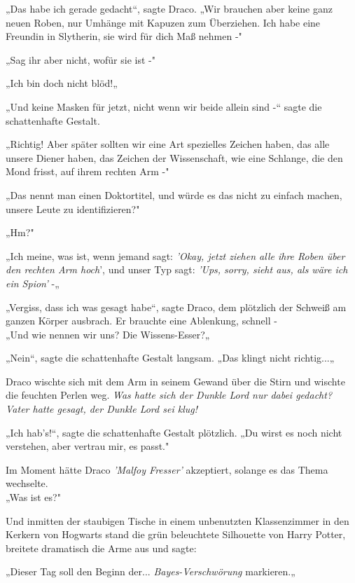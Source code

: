 {„Das habe ich gerade gedacht“, sagte Draco. „Wir brauchen aber keine ganz neuen Roben, nur Umhänge mit Kapuzen zum Überziehen. Ich habe eine Freundin in Slytherin, sie wird für dich Maß nehmen -"

„Sag ihr aber nicht, wofür sie ist -"

„Ich bin doch nicht blöd!„

„Und keine Masken für jetzt, nicht wenn wir beide allein sind -“ sagte die schattenhafte Gestalt.

„Richtig! Aber später sollten wir eine Art spezielles Zeichen haben, das alle unsere Diener haben, das Zeichen der Wissenschaft, wie eine Schlange, die den Mond frisst, auf ihrem rechten Arm -"

„Das nennt man einen Doktortitel, und würde es das nicht zu einfach machen, unsere Leute zu identifizieren?"

„Hm?"

„Ich meine, was ist, wenn jemand sagt: \emph{'Okay, jetzt ziehen alle ihre Roben über den rechten Arm hoch}', und unser Typ sagt: \emph{'Ups, sorry, sieht aus, als wäre ich ein Spion'} -„

„Vergiss, dass ich was gesagt habe“, sagte Draco, dem plötzlich der Schweiß am ganzen Körper ausbrach. Er brauchte eine Ablenkung, schnell -\\ „Und wie nennen wir uns? Die Wissens-Esser?„

„Nein“, sagte die schattenhafte Gestalt langsam. „Das klingt nicht richtig...„

Draco wischte sich mit dem Arm in seinem Gewand über die Stirn und wischte die feuchten Perlen weg. \emph{Was hatte sich der Dunkle Lord nur dabei gedacht? Vater hatte gesagt, der Dunkle Lord sei klug!}

„Ich hab's!“, sagte die schattenhafte Gestalt plötzlich. „Du wirst es noch nicht verstehen, aber vertrau mir, es passt."

Im Moment hätte Draco \emph{'Malfoy Fresser'} akzeptiert, solange es das Thema wechselte.\\ „Was ist es?"

Und inmitten der staubigen Tische in einem unbenutzten Klassenzimmer in den Kerkern von Hogwarts stand die grün beleuchtete Silhouette von Harry Potter, breitete dramatisch die Arme aus und sagte:

„Dieser Tag soll den Beginn der... \emph{Bayes-Verschwörung} markieren.„

}
